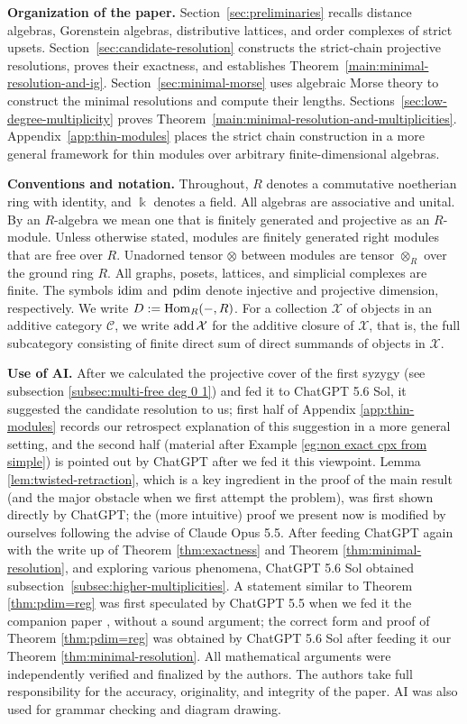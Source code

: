 \documentclass[a4paper,leqno]{amsart}
\begin{document}
{\medskip
\noindent
\textbf{Organization of the paper.} Section~\ref{sec:preliminaries} recalls distance algebras, Gorenstein algebras, distributive lattices, and order complexes of strict upsets. Section~\ref{sec:candidate-resolution} constructs the strict-chain projective resolutions, proves their exactness, and establishes Theorem~\ref{main:minimal-resolution-and-ig}. Section~\ref{sec:minimal-morse} uses algebraic Morse theory to construct the minimal resolutions and compute their lengths. Sections~\ref{sec:low-degree-multiplicity} proves Theorem~\ref{main:minimal-resolution-and-multiplicities}. Appendix~\ref{app:thin-modules} places the strict chain construction in a more general framework for thin modules over arbitrary finite-dimensional algebras.}

\medskip
\noindent
{\bf Conventions and notation.} Throughout, $R$ denotes a commutative noetherian ring with identity, and $\Bbbk$ denotes a field. All algebras are associative and unital. By an $R$-algebra we mean one that is finitely generated and projective as an $R$-module. Unless otherwise stated, modules are finitely generated right modules that are free over $R$. Unadorned tensor $\otimes$ between modules are tensor $\otimes_R$ over the ground ring $R$. All graphs, posets, lattices, and simplicial complexes are finite. The symbols $\operatorname{idim}$ and $\operatorname{pdim}$ denote injective and projective dimension, respectively. We write $D:=\operatorname{Hom}_R(-,R)$. For a collection $\mathcal{X}$ of objects in an additive category $\mathcal{C}$, we write $\operatorname{add} \mathcal{X}$ for the additive closure of $\mathcal{X}$, that is, the full subcategory consisting of finite direct sum of direct summands of objects in $\mathcal{X}$.

\medskip
\noindent
\textbf{Use of AI.} After we calculated the projective cover of the first syzygy (see subsection \ref{subsec:multi-free deg 0 1}) and fed it to ChatGPT 5.6 Sol, it suggested the candidate resolution to us; first half of Appendix \ref{app:thin-modules} records our retrospect explanation of this suggestion in a more general setting, and the second half (material after Example \ref{eg:non exact cpx from simple}) is pointed out by ChatGPT after we fed it this viewpoint.
Lemma \ref{lem:twisted-retraction}, which is a key ingredient in the proof of the main result (and the major obstacle when we first attempt the problem), was first shown directly by ChatGPT; the (more intuitive) proof we present now is modified by ourselves following the advise of Claude Opus 5.5.
After feeding ChatGPT again with the write up of Theorem \ref{thm:exactness} and 
Theorem \ref{thm:minimal-resolution}, and exploring various phenomena, ChatGPT 5.6 Sol obtained subsection~\ref{subsec:higher-multiplicities}.
A statement similar to Theorem \ref{thm:pdim=reg} was first speculated by ChatGPT 5.5 when we fed it the companion paper \cite{CX26}, without a sound argument; the correct form and proof of Theorem \ref{thm:pdim=reg} was obtained by ChatGPT 5.6 Sol after feeding it our Theorem \ref{thm:minimal-resolution}.
All mathematical arguments were independently verified and finalized by the authors. The authors take full responsibility for the accuracy, originality, and integrity of the paper.
AI was also used for grammar checking and diagram drawing.
\end{document}
